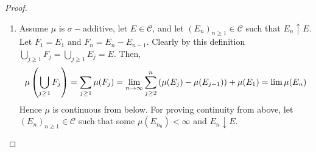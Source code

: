 \begin{proof}
  \begin{enumerate}
    \item Assume $\mu$ is $\sigma-$additive, let $E\in \mathscr{C}$, and let $(E_n)_{n\geq 1}\in \mathscr{C}$ such that $E_n \uparrow E$. Let $F_1 = E_1$ and $F_n = E_n-E_{n-1}$. Clearly by this definition $\bigcup_{j\geq 1} F_j = \bigcup_{j\geq 1} E_j = E$. Then,
      \[\mu\left(\bigcup_{j\geq 1} F_j\right) = \sum_{j\geq 1}\mu(F_j) = \lim_{n\to\infty}\sum_{j\geq 2}^n\left(\mu(E_j)- \mu(E_{j-1})\right) + \mu(E_1) = \lim\mu(E_n)\]
      Hence $\mu$ is continuous from below. For proving continuity from above, let $(E_n)_{n\geq 1}\in \mathscr{C}$ such that some $\mu(E_{n_0}) <\infty$ and $E_n \downarrow E$.
  \end{enumerate}
\end{proof}
%
%
%
